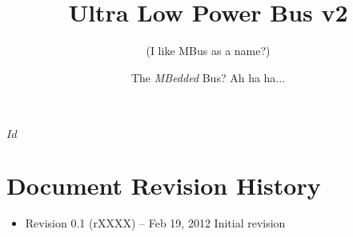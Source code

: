 \documentclass{article}
\begin{document}
\svnInfo $Id$ 

\pagestyle{fancyplain}

\title{Ultra Low Power Bus v2}
\author{(I like MBus as a name?)}
\date{The {\em MBedded} Bus? Ah ha ha...}
\maketitle





\tableofcontents
\clearpage


\clearpage


\clearpage


\clearpage


\clearpage


\clearpage


\clearpage


\clearpage



\clearpage
\section{Document Revision History}
\label{sec:revisions}

\begin{itemize}

\item Revision 0.1 {\footnotesize(rXXXX)} -- Feb 19, 2012
\subitem Initial revision

\end{itemize}

\end{document}
